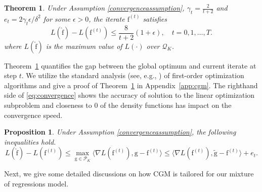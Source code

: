 \documentclass[11pt]{article}
\numberwithin{equation}{section}
\newtheorem{theorem}{Theorem}[section]
\newtheorem{proposition}{Proposition}[section]
\newcommand{\PS}{\mathcal{P}}
\newcommand{\QS}{\mathcal{Q}}
\newcommand{\fv}{\mathrm{f}}
\newcommand{\gv}{\mathrm{g}}
\begin{document}
\begin{theorem}
Under Assumption \ref{convergenceassumption}, $\gamma_t = \frac{2}{t+2}$ and $e_t = 2\gamma_t \epsilon/\delta^2$ for some $\epsilon>0$,  the iterate $\fv^{(t)}$ satisfies 
\begin{equation}
L(\hat{\fv}) - L(\fv^{(t)})  \leq \frac{8}{
t+2}( 1+\epsilon), \quad t = 0,1,\dots, T.
\label{eq:convergence}
\end{equation}
where $L(\hat{\fv})$ is the maximum value of $L(\cdot)$ over $\QS_K$.
\label{thm:CGMconvergence}
\end{theorem}

Theorem~\ref{thm:CGMconvergence} quantifies the gap between the global optimum and current iterate at step $t$. We utilize the standard analysis (see, e.g., \citet{jaggi2013revisiting}) of first-order optimization algorithms and give a proof of Theorem~\ref{thm:CGMconvergence} in Appendix~\ref{app:cgm}. The righthand side of \eqref{eq:convergence} shows the accuracy of solution to the linear optimization subproblem and closeness to $0$ of the density functions has impact on the convergence speed. 

\begin{proposition}
\label{prop:stoppingcriterion}
Under Assumption \ref{convergenceassumption}, the following inequalities hold.
\begin{equation}
L(\hat{\fv}) - L(\fv^{(t)})  \leq \max_{\gv \in \PS_K} \langle \nabla L(\fv^{(t)}), \gv - \fv^{(t)} \rangle \leq 
\langle \nabla L(\fv^{(t)}), \tilde{\gv} - \fv^{(t)} \rangle + e_t.
\end{equation}
\end{proposition}
Next, we give some detailed discussions on how CGM is tailored for our mixture of regressions model.
\end{document}
